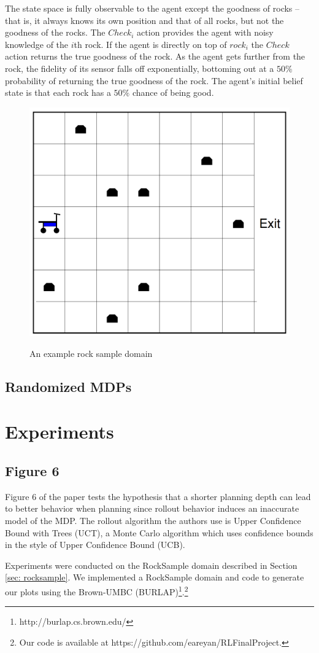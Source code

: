 \documentclass[11pt,twocolumn]{article}
\begin{document}
The state space is fully observable to the agent except the goodness of rocks -- that is, it always knows its own position and that of all rocks, but not the goodness of the rocks. The $Check_i$ action provides the agent with noisy knowledge of the $i$th rock. If the agent is directly on top of $rock_i$ the $Check$ action returns the true goodness of the rock. As the agent gets further from the rock, the fidelity of its sensor falls off exponentially, bottoming out at a $50\%$ probability of returning the true goodness of the rock. The agent's initial belief state is that each rock has a $50\%$ chance of being good.

\begin{figure}[h]
\label{fig: RockSample}
\centering
\includegraphics[page=1,width=.37\textwidth]{rock_sample_domain.png} \\
\caption{An example rock sample domain}
\end{figure}

\subsection{Randomized MDPs}


\section{Experiments}
\subsection{Figure 6}
Figure 6 of the paper tests the hypothesis that a shorter planning depth can lead to better behavior when planning since rollout behavior induces an inaccurate model of the MDP. The rollout algorithm the authors use is Upper Confidence Bound with Trees (UCT), a Monte Carlo algorithm which uses confidence bounds in the style of Upper Confidence Bound (UCB).

Experiments were conducted on the RockSample domain described in Section \ref{sec: rocksample}. We implemented a RockSample domain and code to generate our plots using the Brown-UMBC (BURLAP)\footnote{http://burlap.cs.brown.edu/}.\footnote{Our code is available at https://github.com/eareyan/RLFinalProject.}
\end{document}
